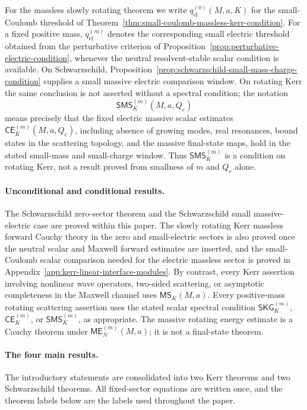 \documentclass[11pt]{article}
\numberwithin{equation}{section}
\theoremstyle{plain}
\theoremstyle{definition}
\theoremstyle{remark}
\newcommand{\SKG}{\mathsf{SKG}}
\newcommand{\CElec}{\mathsf{CE}}
\newcommand{\ME}{\mathsf{ME}}
\newcommand{\MScat}{\mathsf{MS}}
\newcommand{\SMS}{\mathsf{SMS}}
\begin{document}
For the massless slowly rotating theorem we write \(q_{\mathrm{el}}^{(0)}(M,a,K)\) for the small-Coulomb threshold of Theorem~\ref{thm:small-coulomb-massless-kerr-condition}.  For a fixed positive mass, \(q_{\mathrm{el}}^{(m)}\) denotes the corresponding small electric threshold obtained from the perturbative criterion of Proposition~\ref{prop:perturbative-electric-condition}, whenever the neutral resolvent-stable scalar condition is available.  On Schwarzschild, Proposition~\ref{prop:schwarzschild-small-mass-charge-condition} supplies a small massive electric comparison window.  On rotating Kerr the same conclusion is not asserted without a spectral condition; the notation
\begin{equation}\label{eq:sms-window-symbol}
 \SMS_K^{(m)}(M,a,Q_e)
\end{equation}
means precisely that the fixed electric massive scalar estimates \(\CElec_K^{(m)}(M,a,Q_e)\), including absence of growing modes, real resonances, bound states in the scattering topology, and the massive final-state maps, hold in the stated small-mass and small-charge window.  Thus \(\SMS_K^{(m)}\) is a condition on rotating Kerr, not a result proved from smallness of \(m\) and \(Q_e\) alone.


\paragraph{Unconditional and conditional results.}
The Schwarzschild zero-sector theorem and the Schwarzschild small massive-electric case are proved within this paper.  The slowly rotating Kerr massless forward Cauchy theory in the zero and small-electric sectors is also proved once the neutral scalar and Maxwell forward estimates are inserted, and the small-Coulomb scalar comparison needed for the electric massless sector is proved in Appendix~\ref{app:kerr-linear-interface-modules}.  By contrast, every Kerr assertion involving nonlinear wave operators, two-sided scattering, or asymptotic completeness in the Maxwell channel uses \(\MScat_K(M,a)\).  Every positive-mass rotating scattering assertion uses the stated scalar spectral condition \(\SKG_K^{(m)}\), \(\CElec_K^{(m)}\), or \(\SMS_K^{(m)}\), as appropriate.  The massive rotating energy estimate is a Cauchy theorem under \(\ME_N^{(m)}(M,a)\); it is not a final-state theorem.

\paragraph{The four main results.}
The introductory statements are consolidated into two Kerr theorems and two Schwarzschild theorems.  All fixed-sector equations are written once, and the theorem labels below are the labels used throughout the paper.
\end{document}
